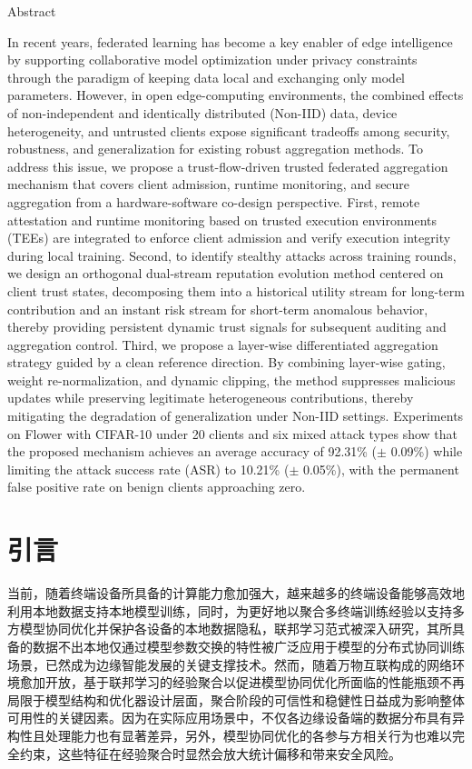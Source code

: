 \documentclass[11pt, a4paper, UTF8, fontset=fandol]{ctexart}
\begin{document}
\begin{center}
    Abstract
\end{center}
In recent years, federated learning has become a key enabler of edge
intelligence by supporting collaborative model optimization under privacy
constraints through the paradigm of keeping data local and exchanging only
model parameters. However, in open edge-computing environments, the combined
effects of non-independent and identically distributed (Non-IID) data,
device heterogeneity, and untrusted clients expose significant tradeoffs
among security, robustness, and generalization for existing robust
aggregation methods. To address this issue, we propose a trust-flow-driven
trusted federated aggregation mechanism that covers client admission, runtime
monitoring, and secure aggregation from a hardware-software co-design
perspective. First, remote attestation and runtime monitoring based on
trusted execution environments (TEEs) are integrated to enforce client
admission and verify execution integrity during local training. Second, to
identify stealthy attacks across training rounds, we design an orthogonal
dual-stream reputation evolution method centered on client trust states,
decomposing them into a historical utility stream for long-term contribution
and an instant risk stream for short-term anomalous behavior, thereby
providing persistent dynamic trust signals for subsequent auditing and
aggregation control. Third, we propose a layer-wise
differentiated aggregation strategy guided by a clean reference direction.
By combining layer-wise gating, weight re-normalization, and dynamic
clipping, the method suppresses malicious updates while preserving legitimate
heterogeneous contributions, thereby mitigating the degradation of
generalization under Non-IID settings. Experiments on Flower with CIFAR-10
under 20 clients and six mixed attack types show that the proposed mechanism
achieves an average accuracy of 92.31\% ($\pm$ 0.09\%) while limiting the
attack success rate (ASR) to 10.21\% ($\pm$ 0.05\%), with the permanent false
positive rate on benign clients approaching zero.

\section{引言}
当前，随着终端设备所具备的计算能力愈加强大，越来越多的终端设备能够高效地利用本地数据支持本地模型训练，同时，为更好地以聚合多终端训练经验以支持多方模型协同优化并保护各设备的本地数据隐私，联邦学习范式被深入研究\cite{kairouz2021flsurvey}，其所具备的数据不出本地仅通过模型参数交换的特性被广泛应用于模型的分布式协同训练场景，已然成为边缘智能发展的关键支撑技术。然而，随着万物互联构成的网络环境愈加开放，基于联邦学习的经验聚合以促进模型协同优化所面临的性能瓶颈不再局限于模型结构和优化器设计层面，聚合阶段的可信性和稳健性日益成为影响整体可用性的关键因素。因为在实际应用场景中，不仅各边缘设备端的数据分布具有异构性且处理能力也有显著差异，另外，模型协同优化的各参与方相关行为也难以完全约束，这些特征在经验聚合时显然会放大统计偏移和带来安全风险。
\end{document}
